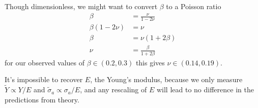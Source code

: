 \documentclass{article}
\begin{document}
Though dimensionless, we might want to convert $\beta$ to a Poisson ratio
\begin{align*}
    \beta &= \frac{\nu}{1-2\nu}
    \\
    \beta(1-2\nu) &= \nu
    \\
    \beta &= \nu(1 + 2\beta)
    \\
    \nu &= \frac{\beta}{1 + 2\beta}
\end{align*}
for our observed values of $\beta\in(0.2, 0.3)$ this gives $\nu\in(0.14, 0.19)$.

It's impossible to recover $E$, the Young's modulus, because we only measure $\tilde{Y} \propto Y/E$ and $\tilde{\sigma}_a \propto \sigma_a/E$, and any rescaling of $E$ will lead to no difference in the predictions from theory.
\end{document}
